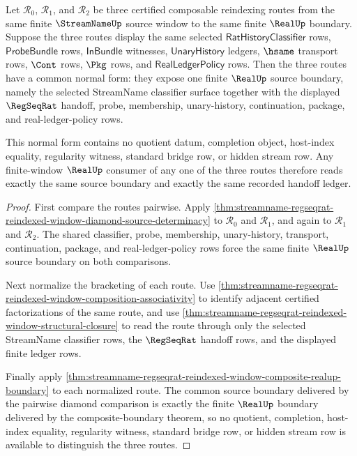 \begin{theorem}
\label{thm:streamname-regseqrat-reindexed-window-triple-diamond-normal-form}
Let $\mathcal R_0$, $\mathcal R_1$, and $\mathcal R_2$ be three certified
composable reindexing routes from the same finite $\StreamNameUp$ source
window to the same finite $\RealUp$ boundary. Suppose the three routes display
the same selected $\mathsf{RatHistoryClassifier}$ rows, $\mathsf{ProbeBundle}$
rows, $\mathsf{InBundle}$ witnesses, $\mathsf{UnaryHistory}$ ledgers, $\hsame$
transport rows, $\Cont$ rows, $\Pkg$ rows, and $\mathsf{RealLedgerPolicy}$
rows. Then the three routes have a common normal form: they expose one finite
$\RealUp$ source boundary, namely the selected StreamName classifier surface
together with the displayed $\RegSeqRat$ handoff, probe, membership,
unary-history, continuation, package, and real-ledger-policy rows.

This normal form contains no quotient datum, completion object, host-index
equality, regularity witness, standard bridge row, or hidden stream row. Any
finite-window $\RealUp$ consumer of any one of the three routes therefore reads
exactly the same source boundary and exactly the same recorded handoff ledger.
\end{theorem}
\begin{proof}
First compare the routes pairwise. Apply
\autoref{thm:streamname-regseqrat-reindexed-window-diamond-source-determinacy}
to $\mathcal R_0$ and $\mathcal R_1$, and again to $\mathcal R_1$ and
$\mathcal R_2$. The shared classifier, probe, membership, unary-history,
transport, continuation, package, and real-ledger-policy rows force the same
finite $\RealUp$ source boundary on both comparisons.

Next normalize the bracketing of each route. Use
\autoref{thm:streamname-regseqrat-reindexed-window-composition-associativity}
to identify adjacent certified factorizations of the same route, and use
\autoref{thm:streamname-regseqrat-reindexed-window-structural-closure} to read
the route through only the selected StreamName classifier rows, the
$\RegSeqRat$ handoff rows, and the displayed finite ledger rows.

Finally apply
\autoref{thm:streamname-regseqrat-reindexed-window-composite-realup-boundary}
to each normalized route. The common source boundary delivered by the pairwise
diamond comparison is exactly the finite $\RealUp$ boundary delivered by the
composite-boundary theorem, so no quotient, completion, host-index equality,
regularity witness, standard bridge row, or hidden stream row is available to
distinguish the three routes.
\end{proof}

